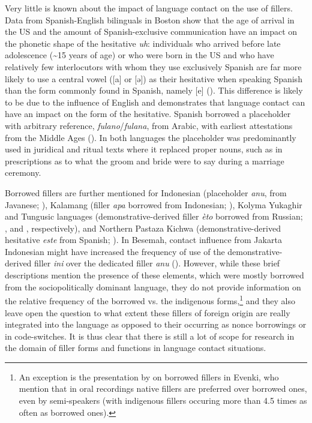 \documentclass[output=paper]{langscibook}
\begin{document}
Very little is known about the impact of language contact on the use of fillers. Data from Spanish-English bilinguals in Boston show that the age of arrival in the US and the amount of Spanish-exclusive communication have an impact on the phonetic shape of the hesitative \textit{uh}: individuals who arrived before late adolescence ({\textasciitilde}15 years of age) or who were born in the US and who have relatively few interlocutors with whom they use exclusively Spanish are far more likely to use a central vowel ([a] or [ə]) as their hesitative when speaking Spanish than the form commonly found in Spanish, namely [e] (\citealt{Erker2022}). This difference is likely to be due to the influence of English and demonstrates that language contact can have an impact on the form of the hesitative. Spanish borrowed a placeholder with arbitrary reference, \textit{fulano}/\textit{fulana}, from Arabic, with earliest attestations from the Middle Ages (\citealt{Gerhalter2020}). In both languages the placeholder was predominantly used in juridical and ritual texts where it replaced proper nouns, such as in prescriptions as to what the groom and bride were to say during a marriage ceremony. 

Borrowed fillers are further mentioned for Indonesian (placeholder \textit{anu}, from Javanese; \citealt[9]{Williams2009}), Kalamang (filler \textit{apa} borrowed from Indonesian; \citealt{chapters/visser}), Kolyma Yukaghir and Tungusic languages (demonstrative-derived filler \textit{èto} borrowed from Russian; \citealt{chapters/ventayol_boada}, and \citealt{chapters/klyachko}, respectively), and Northern Pastaza Kichwa (demonstrative-derived hesitative \textit{este} from Spanish; \citealt{chapters/rice}). In Besemah, contact influence from Jakarta Indonesian might have increased the frequency of use of the demonstrative-derived filler \textit{ini} over the dedicated filler \textit{anu} (\citealt{chapters/mcdonnell_billings}). However, while these brief descriptions mention the presence of these elements, which were mostly borrowed from the sociopolitically dominant language, they do not provide information on the relative frequency of the borrowed vs. the indigenous forms,\footnote{An exception is the presentation by \citet{Egorova2021} on borrowed fillers in Evenki, who mention that in oral recordings native fillers are preferred over borrowed ones, even by semi-speakers (with indigenous fillers occuring more than 4.5 times as often as borrowed ones).} and they also leave open the question to what extent these fillers of foreign origin are really integrated into the language as opposed to their occurring as nonce borrowings or in code-switches. It is thus clear that there is still a lot of scope for research in the domain of filler forms and functions in language contact situations.
\end{document}
